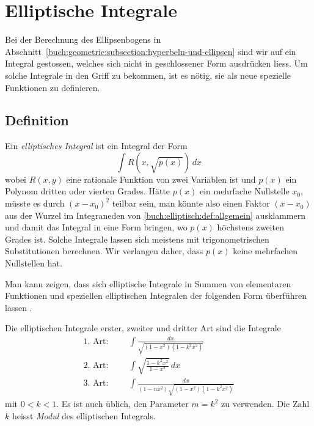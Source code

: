 %
%
%
\section{Elliptische Integrale
\label{buch:elliptisch:section:integral}}
Bei der Berechnung des Ellipsenbogens in 
Abschnitt~\ref{buch:geometrie:subsection:hyperbeln-und-ellipsen}
sind wir auf ein Integral gestossen, welches sich nicht in geschlossener
Form ausdrücken liess.
Um solche Integrale in den Griff zu bekommen, ist es nötig, sie als
neue spezielle Funktionen zu definieren.

\subsection{Definition
\label{buch:elliptisch:subsection:definition}}
Ein {\em elliptisches Integral} ist ein Integral der Form
%
%
\begin{equation}
\int R\left( x, \sqrt{p(x)}\right)\,dx
\label{buch:elliptisch:def:allgemein}
\end{equation}
wobei $R(x,y)$ eine rationale Funktion von zwei Variablen ist und
$p(x)$ ein Polynom dritten oder vierten Grades.
Hätte $p(x)$ ein mehrfache Nullstelle $x_0$, müsste es durch $(x-x_0)^2$
teilbar sein, man könnte also einen Faktor $(x-x_0)$ aus der
Wurzel im Integraneden von \eqref{buch:elliptisch:def:allgemein}
ausklammern und damit das Integral in eine Form bringen, wo $p(x)$
höchstens zweiten Grades ist.
Solche Integrale lassen sich meistens mit trigonometrischen Substitutionen
berechnen.
Wir verlangen daher, dass $p(x)$ keine mehrfachen Nullstellen hat.

Man kann zeigen, dass sich elliptische Integrale in Summen von
elementaren Funktionen und speziellen elliptischen Integralen 
der folgenden Form überführen lassen
\cite[Abschnitt 164, p.~506]{buch:smirnov32}.

\begin{definition}
\label{buch:elliptisch:def:integrale123}
Die elliptischen Integrale erster, zweiter und dritter Art sind die
Integrale
\[
\begin{aligned}
\text{1.~Art:}&&&
\int \frac{dx}{\sqrt{(1-x^2)(1-k^2x^2)}}
\\
\text{2.~Art:}&&&
\int \sqrt{\frac{1-k^2x^2}{1-x^2}}\,dx
\\
\text{3.~Art:}&&&
\int \frac{dx}{(1-nx^2)\sqrt{(1-x^2)(1-k^2x^2)}}
\end{aligned}
\]
mit $0<k<1$.
Es ist auch üblich, den Parameter $m=k^2$ zu verwenden.
Die Zahl $k$ heisst {\em Modul} des elliptischen Integrals.
%
%
\end{definition}

